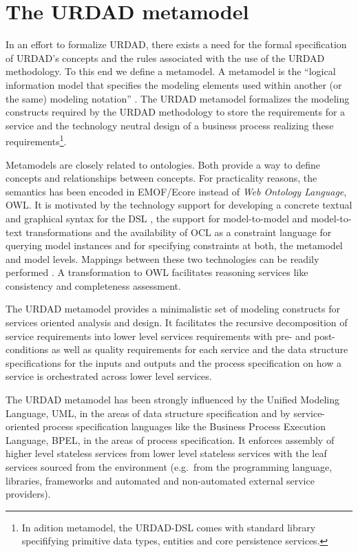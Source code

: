 \section{The URDAD metamodel \label{sec:metamodel}}

In an effort to formalize URDAD, there exists a need for the formal specification of URDAD's concepts and the rules associated with the use of the URDAD methodology. To this end we define a metamodel. A metamodel is the ``logical information model that specifies the modeling elements used within another (or the same) modeling notation'' \cite{_ieee_2003}. The URDAD metamodel formalizes the modeling constructs required by the URDAD methodology to store the requirements for a service and the technology neutral design of a business process realizing these requirements\footnote{In adition metamodel, the URDAD-DSL comes with standard library specififying primitive data types, entities and core persistence services.}. 

Metamodels are closely related to ontologies. Both provide a way to define concepts and relationships between concepts. For practicality reasons, the semantics has been encoded in EMOF/Ecore instead of {\em Web Ontology Language}, OWL\cite{zuo_zhihong_web_2003}. It is motivated by the technology support for developing a concrete textual and graphical syntax for the DSL \cite{heidenreich_derivation_2009}, the support for model-to-model \cite{_meta_2011} and model-to-text transformations \cite{model2text} and the availability of OCL as a constraint language \cite{OCL} for querying model instances and for specifying constraints at both, the metamodel and model levels. Mappings between these two technologies can be readily performed \cite{staab_model_2010}. A transformation to OWL facilitates reasoning services like consistency and completeness assessment.

The URDAD metamodel provides a minimalistic set of modeling constructs for services oriented analysis and design. It facilitates the recursive decomposition of service requirements into lower level services requirements with pre- and post-conditions as well as quality requirements for each service and the data structure specifications for the inputs and outputs and the process specification on how a service is orchestrated across lower level services. 


The URDAD metamodel has been strongly influenced by the Unified Modeling Language, UML, in the areas of data structure specification and by service-oriented process specification languages like the Business Process Execution Language, BPEL, in the areas of process specification. 
It enforces assembly of higher level stateless services from lower level stateless services with the leaf services sourced from the environment (e.g.\ from the programming language, libraries, frameworks and automated and non-automated external service providers). 

